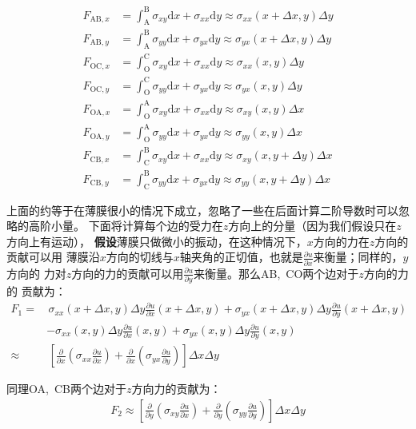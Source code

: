 \documentclass[a4paper]{ctexart}
\def\d{\mathrm{d}}
\newcommand{\mr}[1]{\mathrm{#1}}
\newcommand{\pdv}[2]{\frac{\partial{#1}}{\partial{#2}}}
\begin{document}
	\begin{align}
		F_{\mr{AB}, x} &= \int_{\mr{A}}^{\mr{B}} \sigma_{xy}\d x + \sigma_{xx}\d y \approx \sigma_{xx}(x+\Delta x, y)\Delta y\\
		F_{\mr{AB}, y} &= \int_{\mr{A}}^{\mr{B}} \sigma_{yy}\d x + \sigma_{yx}\d y \approx \sigma_{yx}(x+\Delta x, y)\Delta y\\
		F_{\mr{OC}, x} &= \int_{\mr{O}}^{\mr{C}} \sigma_{xy}\d x + \sigma_{xx}\d y \approx \sigma_{xx}(x, y)\Delta y\\
		F_{\mr{OC}, y} &= \int_{\mr{O}}^{\mr{C}} \sigma_{yy}\d x + \sigma_{yx}\d y \approx \sigma_{yx}(x, y)\Delta y\\
		F_{\mr{OA}, x} &= \int_{\mr{O}}^{\mr{A}} \sigma_{xy}\d x + \sigma_{xx}\d y \approx \sigma_{xy}(x, y)\Delta x\\
		F_{\mr{OA}, y} &= \int_{\mr{O}}^{\mr{A}} \sigma_{yy}\d x + \sigma_{yx}\d y \approx \sigma_{yy}(x, y)\Delta x\\
		F_{\mr{CB}, x} &= \int_{\mr{C}}^{\mr{B}} \sigma_{xy}\d x + \sigma_{xx}\d y \approx \sigma_{xy}(x, y + \Delta y)\Delta x\\
		F_{\mr{CB}, y} &= \int_{\mr{C}}^{\mr{B}} \sigma_{yy}\d x + \sigma_{yx}\d y \approx \sigma_{yy}(x, y + \Delta y)\Delta x
	\end{align}
	\par 上面的约等于在薄膜很小的情况下成立，忽略了一些在后面计算二阶导数时可以忽略的高阶小量。
	下面将计算每个边的受力在$z$方向上的分量（因为我们假设只在$z$方向上有运动），
	\textbf{假设}薄膜只做微小的振动，在这种情况下，$x$方向的力在$z$方向的贡献可以用
	薄膜沿$x$方向的切线与$x$轴夹角的正切值，也就是$\pdv{u}{x}$来衡量；同样的，$y$方向的
	力对$z$方向的力的贡献可以用$\pdv{u}{y}$来衡量。那么AB,\, CO两个边对于$z$方向的力的
	贡献为：
	\begin{align}
		F_{1} =& \,\sigma_{xx}(x+\Delta x, y)\Delta y\pdv{u}{x}(x+\Delta x, y) + \sigma_{yx}(x+\Delta x, y)\Delta y\pdv{u}{y}(x+\Delta x, y)\\
		&- \sigma_{xx}(x, y)\Delta y\pdv{u}{x}(x, y) + \sigma_{yx}(x, y)\Delta y\pdv{u}{y}(x, y)\\
		\approx& \, \left[\pdv{}{x}\left(\sigma_{xx}\pdv{u}{x}\right) + \pdv{}{x}\left(\sigma_{yx}\pdv{u}{y}\right)\right]\Delta x\Delta y
	\end{align}
	\par 同理OA,\, CB两个边对于$z$方向力的贡献为：
	\begin{align}
		F_{2} \approx  \left[\pdv{}{y}\left(\sigma_{xy}\pdv{u}{x}\right) + \pdv{}{y}\left(\sigma_{yy}\pdv{u}{y}\right)\right]\Delta x\Delta y
	\end{align}
\end{document}
